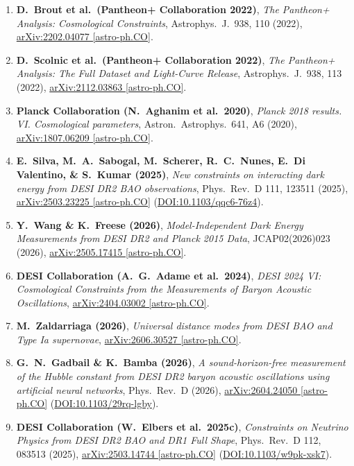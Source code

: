 \documentclass[aps,prd,preprint,superscriptaddress,nofootinbib]{revtex4-2}
\begin{document}
\begin{enumerate}
    \item \textbf{D.\ Brout et al.\ (Pantheon+ Collaboration 2022)}, \emph{The Pantheon+ Analysis: Cosmological Constraints}, Astrophys.\ J.\ 938, 110 (2022), \href{https://arxiv.org/abs/2202.04077}{arXiv:2202.04077 [astro-ph.CO]}.
    \item \textbf{D.\ Scolnic et al.\ (Pantheon+ Collaboration 2022)}, \emph{The Pantheon+ Analysis: The Full Dataset and Light-Curve Release}, Astrophys.\ J.\ 938, 113 (2022), \href{https://arxiv.org/abs/2112.03863}{arXiv:2112.03863 [astro-ph.CO]}.
    \item \textbf{Planck Collaboration (N.\ Aghanim et al.\ 2020)}, \emph{Planck 2018 results. VI. Cosmological parameters}, Astron.\ Astrophys.\ 641, A6 (2020), \href{https://arxiv.org/abs/1807.06209}{arXiv:1807.06209 [astro-ph.CO]}.
    \item \textbf{E.\ Silva, M.\ A.\ Sabogal, M.\ Scherer, R.\ C.\ Nunes, E.\ Di Valentino, \& S.\ Kumar (2025)}, \emph{New constraints on interacting dark energy from DESI DR2 BAO observations}, Phys.\ Rev.\ D 111, 123511 (2025), \href{https://arxiv.org/abs/2503.23225}{arXiv:2503.23225 [astro-ph.CO]} (\href{https://link.aps.org/doi/10.1103/qqc6-76z4}{DOI:10.1103/qqc6-76z4}).
    \item \textbf{Y.\ Wang \& K.\ Freese (2026)}, \emph{Model-Independent Dark Energy Measurements from DESI DR2 and Planck 2015 Data}, JCAP02(2026)023 (2026), \href{https://arxiv.org/abs/2505.17415}{arXiv:2505.17415 [astro-ph.CO]}.
    \item \textbf{DESI Collaboration (A.\ G.\ Adame et al.\ 2024)}, \emph{DESI 2024 VI: Cosmological Constraints from the Measurements of Baryon Acoustic Oscillations}, \href{https://arxiv.org/abs/2404.03002}{arXiv:2404.03002 [astro-ph.CO]}.
    \item \textbf{M.\ Zaldarriaga (2026)}, \emph{Universal distance modes from DESI BAO and Type Ia supernovae}, \href{https://arxiv.org/abs/2606.30527}{arXiv:2606.30527 [astro-ph.CO]}.
    \item \textbf{G.\ N.\ Gadbail \& K.\ Bamba (2026)}, \emph{A sound-horizon-free measurement of the Hubble constant from DESI DR2 baryon acoustic oscillations using artificial neural networks}, Phys.\ Rev.\ D (2026), \href{https://arxiv.org/abs/2604.24050}{arXiv:2604.24050 [astro-ph.CO]} (\href{https://link.aps.org/doi/10.1103/29rq-lgby}{DOI:10.1103/29rq-lgby}).
    \item \textbf{DESI Collaboration (W.\ Elbers et al.\ 2025c)}, \emph{Constraints on Neutrino Physics from DESI DR2 BAO and DR1 Full Shape}, Phys.\ Rev.\ D 112, 083513 (2025), \href{https://arxiv.org/abs/2503.14744}{arXiv:2503.14744 [astro-ph.CO]} (\href{https://link.aps.org/doi/10.1103/w9pk-xsk7}{DOI:10.1103/w9pk-xsk7}).

\end{enumerate}
\end{document}
